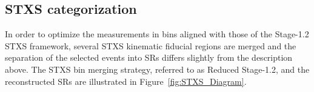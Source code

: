 \subsection{STXS categorization}
\label{subsec:STXS-categorization}







In order to optimize the measurements in bins aligned with those of the Stage-1.2 STXS framework, several STXS kinematic fiducial regions are merged and the separation of the selected events into SRs differs slightly from the description above.
The STXS bin merging strategy, referred to as Reduced Stage-1.2, and the reconstructed SRs are illustrated in Figure~\ref{fig:STXS_Diagram}.

